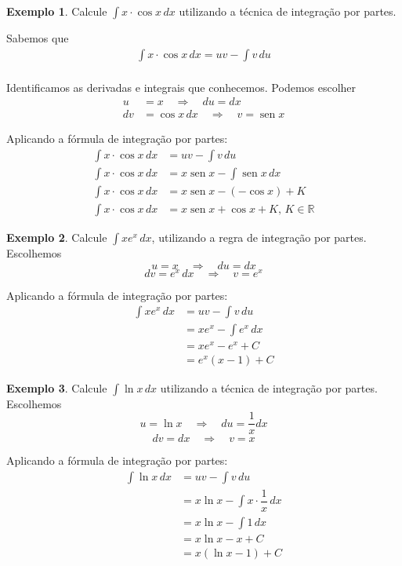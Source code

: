 \documentclass[12pt,openright,twoside,a4paper]{article}
\theoremstyle{definition}
\newtheorem{example}{Exemplo}[section]
\renewcommand{\sin}{\operatorname{sen}} %
\begin{document}
	\begin{example} Calcule $\displaystyle \int x \cdot \cos x \, dx$ utilizando a técnica de integração por partes.
		
		Sabemos que
		\begin{align*}
			\int x \cdot \cos x \, dx = u v - \int v \, du \\
		\end{align*}
		
		Identificamos as derivadas e integrais que conhecemos. Podemos escolher 
		\begin{align*}
			u &= x \quad \Rightarrow \quad du = dx\\
			dv &= \cos x \, dx \quad \Rightarrow \quad v = \sin x
		\end{align*}
		
		Aplicando a fórmula de integração por partes:
		\begin{align*}
			\int x \cdot \cos x \, dx &= u v - \int v \, du \\
			\int x \cdot \cos x \, dx &= x \sin x - \int \sin x \, dx \\
			\int x \cdot \cos x \, dx &= x \sin x - (-\cos x) + K\\
			\int x \cdot \cos x \, dx &= x \sin x + \cos x + K, \, K \in \mathbb{R}
		\end{align*}
	\end{example}
	
	
	\begin{example} Calcule $\displaystyle \int x e^x \, dx$, utilizando a regra de integração por partes.
		Escolhemos 
		$$
		u = x \quad \Rightarrow \quad du = dx
		$$
		$$
		dv = e^x \, dx \quad \Rightarrow \quad v = e^x
		$$
		
		Aplicando a fórmula de integração por partes:
		\begin{align*}
			\int x e^x \, dx &= u v - \int v \, du \\
			&= x e^x - \int e^x \, dx \\
			&= x e^x - e^x + C \\
			&= e^x (x - 1) + C
		\end{align*}
	\end{example}
	
	\begin{example}Calcule $\displaystyle \int \ln{x} \, dx$ utilizando a técnica de integração por partes.
		Escolhemos 
		$$
		u = \ln{x} \quad \Rightarrow \quad du = \dfrac{1}{x} dx
		$$
		$$
		dv = dx \quad \Rightarrow \quad v = x
		$$
		
		Aplicando a fórmula de integração por partes:
		\begin{align*}
			\int \ln{x} \, dx &= u v - \int v \, du \\
			&= x \ln{x} - \int x \cdot \dfrac{1}{x} \, dx \\
			&= x \ln{x} - \int 1 \, dx \\
			&= x \ln{x} - x + C \\
			&= x (\ln{x} - 1) + C
		\end{align*}
	\end{example}
	
\end{document}
